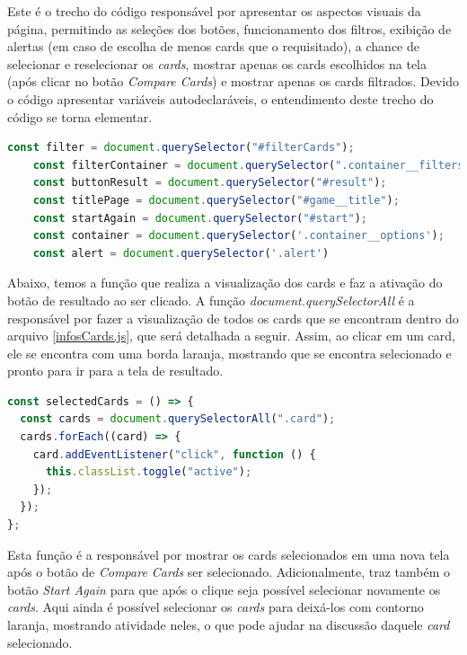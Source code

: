 Este é o trecho do código responsável por apresentar os aspectos visuais da página, permitindo as seleções dos botões, funcionamento dos filtros, exibição de alertas (em caso de escolha de menos cards que o requisitado), a chance de selecionar e reselecionar os \textit{cards}, mostrar apenas os cards escolhidos na tela (após clicar no botão \textit{Compare Cards}) e mostrar apenas os cards filtrados. Devido o código apresentar variáveis autodeclaráveis, o entendimento deste trecho do código se torna elementar.

\begin{lstlisting}[language=JavaScript, caption=Funções que criam o aspecto visual do guia]
    const filter = document.querySelector("#filterCards");
    const filterContainer = document.querySelector(".container__filters");
    const buttonResult = document.querySelector("#result");
    const titlePage = document.querySelector("#game__title");
    const startAgain = document.querySelector("#start");
    const container = document.querySelector('.container__options');
    const alert = document.querySelector('.alert')
\end{lstlisting}

Abaixo, temos a função que realiza a visualização dos cards e faz a ativação do botão de resultado ao ser clicado. A função \textit{document.querySelectorAll} é a responsável por fazer a visualização de todos os cards que se encontram dentro do arquivo \ref{infosCards.js}, que será detalhada a seguir. Assim, ao clicar em um card, ele se encontra com uma borda laranja, mostrando que se encontra selecionado e pronto para ir para a tela de resultado.

\begin{lstlisting}[language=JavaScript, caption=Função que seleciona os cards e ativa o botão de resultado]
const selectedCards = () => {
  const cards = document.querySelectorAll(".card");
  cards.forEach((card) => {
    card.addEventListener("click", function () {
      this.classList.toggle("active");
    });
  });
};
\end{lstlisting}

Esta função é a responsável por mostrar os cards selecionados em uma nova tela após o botão de \textit{Compare Cards} ser selecionado. Adicionalmente, traz também o botão \textit{Start Again} para que após o clique seja possível selecionar novamente os \textit{cards}. Aqui ainda é possível selecionar os \textit{cards} para deixá-los com contorno laranja, mostrando atividade neles, o que pode ajudar na discussão daquele \textit{card} selecionado.

